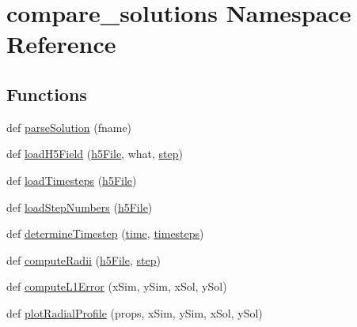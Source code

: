 \hypertarget{namespacecompare__solutions}{}\section{compare\+\_\+solutions Namespace Reference}
\label{namespacecompare__solutions}
\subsection*{Functions}
\begin{DoxyCompactItemize}
\item 
def \mbox{\hyperlink{namespacecompare__solutions_ae6db53243984030adbac586e151de969}{parse\+Solution}} (fname)
\item 
def \mbox{\hyperlink{namespacecompare__solutions_ac7f6e5e690423263698b6a90f4f5eb51}{load\+H5\+Field}} (\mbox{\hyperlink{namespacecompare__solutions_a9aff00b9f52225aceb635bcc6230e32c}{h5\+File}}, what, \mbox{\hyperlink{namespacecompare__solutions_a9e016da601f62bd2e5d85bce6a22bfb6}{step}})
\item 
def \mbox{\hyperlink{namespacecompare__solutions_a027a643ca4b78f4096ae7c990da396d4}{load\+Timesteps}} (\mbox{\hyperlink{namespacecompare__solutions_a9aff00b9f52225aceb635bcc6230e32c}{h5\+File}})
\item 
def \mbox{\hyperlink{namespacecompare__solutions_a3e94566cadb571133ea525491b2e573e}{load\+Step\+Numbers}} (\mbox{\hyperlink{namespacecompare__solutions_a9aff00b9f52225aceb635bcc6230e32c}{h5\+File}})
\item 
def \mbox{\hyperlink{namespacecompare__solutions_a93703a7dfe643e19a4ac6d56ceca5b6e}{determine\+Timestep}} (\mbox{\hyperlink{namespacecompare__solutions_a83a9f408c6948f95c816240ca5e5bf65}{time}}, \mbox{\hyperlink{namespacecompare__solutions_a0c934f0f38e7ab253392939e3068c05e}{timesteps}})
\item 
def \mbox{\hyperlink{namespacecompare__solutions_a8b926f5606b575b076a639234b9f3cf8}{compute\+Radii}} (\mbox{\hyperlink{namespacecompare__solutions_a9aff00b9f52225aceb635bcc6230e32c}{h5\+File}}, \mbox{\hyperlink{namespacecompare__solutions_a9e016da601f62bd2e5d85bce6a22bfb6}{step}})
\item 
def \mbox{\hyperlink{namespacecompare__solutions_a2fe90bcceeb8a3e4204af4eea023ee0d}{compute\+L1\+Error}} (x\+Sim, y\+Sim, x\+Sol, y\+Sol)
\item 
def \mbox{\hyperlink{namespacecompare__solutions_a39cafde6a2fe9a6cafe188215ead093e}{plot\+Radial\+Profile}} (props, x\+Sim, y\+Sim, x\+Sol, y\+Sol)

\end{DoxyCompactItemize}
